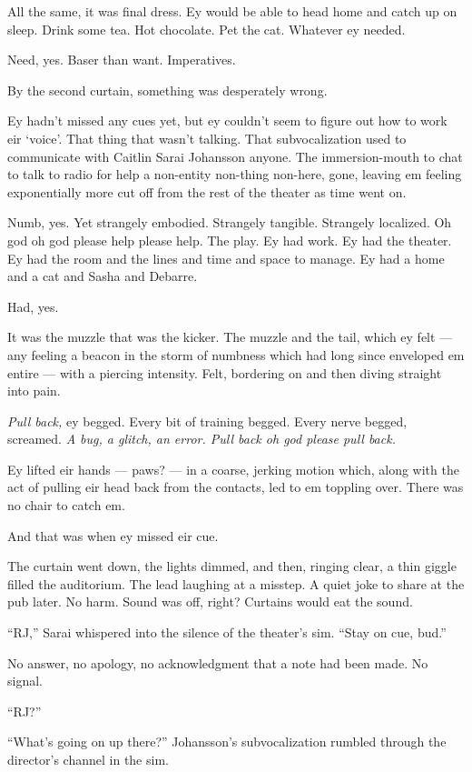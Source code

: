 All the same, it was final dress. Ey would be able to head home and catch up on sleep. Drink some tea. Hot chocolate. Pet the cat. Whatever ey needed.

Need, yes. Baser than want. Imperatives.

By the second curtain, something was desperately wrong.

Ey hadn't missed any cues yet, but ey couldn't seem to figure out how to work eir `voice'. That thing that wasn't talking. That subvocalization used to communicate with Caitlin Sarai Johansson anyone. The immersion-mouth to chat to talk to radio for help a non-entity non-thing non-here, gone, leaving em feeling exponentially more cut off from the rest of the theater as time went on.

Numb, yes. Yet strangely embodied. Strangely tangible. Strangely localized. Oh god oh god please help please help. The play. Ey had work. Ey had the theater. Ey had the room and the lines and time and space to manage. Ey had a home and a cat and Sasha and Debarre.

Had, yes.

It was the muzzle that was the kicker. The muzzle and the tail, which ey felt — any feeling a beacon in the storm of numbness which had long since enveloped em entire — with a piercing intensity. Felt, bordering on and then diving straight into pain.

\emph{Pull back,} ey begged. Every bit of training begged. Every nerve begged, screamed. \emph{A bug, a glitch, an error. Pull back oh god please pull back.}

Ey lifted eir hands — paws? — in a coarse, jerking motion which, along with the act of pulling eir head back from the contacts, led to em toppling over. There was no chair to catch em.

And that was when ey missed eir cue.

The curtain went down, the lights dimmed, and then, ringing clear, a thin giggle filled the auditorium. The lead laughing at a misstep. A quiet joke to share at the pub later. No harm. Sound was off, right? Curtains would eat the sound.

``RJ,'' Sarai whispered into the silence of the theater's sim. ``Stay on cue, bud.''

No answer, no apology, no acknowledgment that a note had been made. No signal.

``RJ?''

``What's going on up there?'' Johansson's subvocalization rumbled through the director's channel in the sim.

